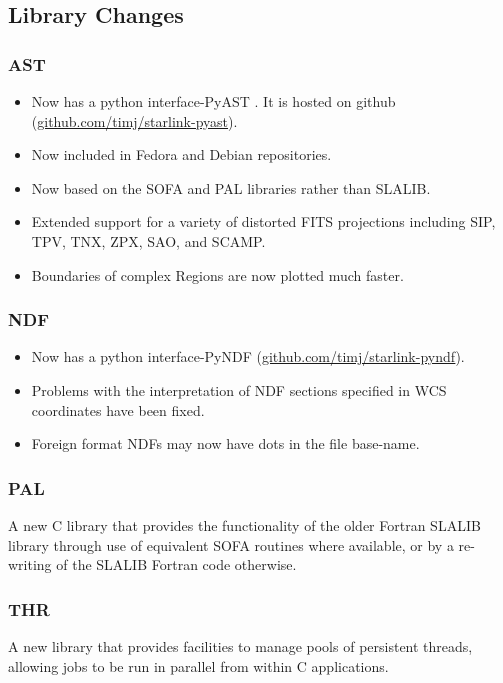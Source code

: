 \subsection{Library Changes}

\subsubsection{AST}
\begin{itemize}
\item Now has a python interface-PyAST \citep{P011_adassxxi}. It is hosted on github (\url{github.com/timj/starlink-pyast}).
\item Now included in Fedora and Debian repositories.
\item Now based on the SOFA and PAL libraries rather than SLALIB.
\item Extended support for a variety of distorted FITS projections including SIP, TPV, TNX, ZPX, SAO, and SCAMP.
\item Boundaries of complex Regions are now plotted much faster.
\end{itemize}

\subsubsection{NDF}
\begin{itemize}
\item Now has a python interface-PyNDF (\url{github.com/timj/starlink-pyndf}).
\item Problems with the interpretation of NDF sections specified in WCS coordinates have been fixed.
\item Foreign format NDFs may now have dots in the file base-name.
\end{itemize}

\subsubsection{PAL}
A new C library that provides the functionality of the older Fortran SLALIB library through use of equivalent SOFA routines where available, or by a re-writing of the SLALIB Fortran code otherwise.

\subsubsection{THR}
A new library that provides facilities to manage pools of persistent threads, allowing jobs to be run in parallel from within C applications.

